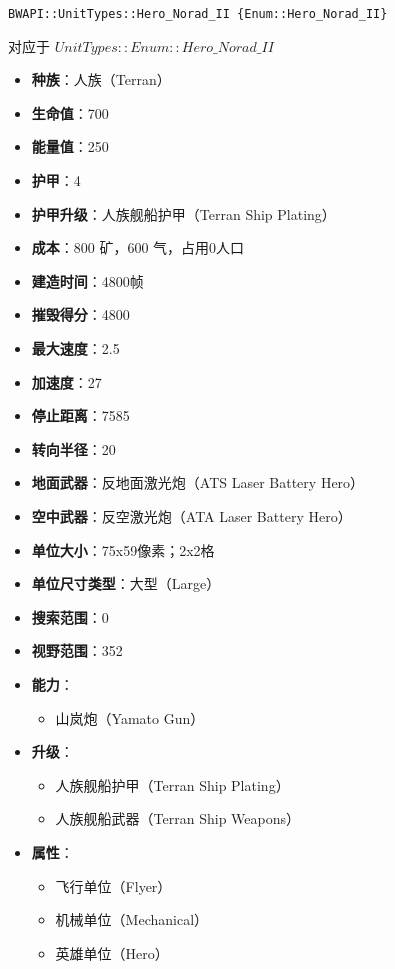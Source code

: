 \begin{tcolorbox}[colback=white, colframe=black!60!white, title=Hero\_Norad\_II(), arc=0mm]
    \begin{verbatim}
BWAPI::UnitTypes::Hero_Norad_II {Enum::Hero_Norad_II}
    \end{verbatim}
    对应于  $ UnitTypes::Enum::Hero\_Norad\_II $ 
    \begin{itemize}
        \item \textbf{种族}：人族（Terran）
        \item \textbf{生命值}：700
        \item \textbf{能量值}：250
        \item \textbf{护甲}：4
        \item \textbf{护甲升级}：人族舰船护甲（Terran Ship Plating）
        \item \textbf{成本}：800 矿，600 气，占用0人口
        \item \textbf{建造时间}：4800帧
        \item \textbf{摧毁得分}：4800
        \item \textbf{最大速度}：2.5
        \item \textbf{加速度}：27
        \item \textbf{停止距离}：7585
        \item \textbf{转向半径}：20
        \item \textbf{地面武器}：反地面激光炮（ATS Laser Battery Hero）
        \item \textbf{空中武器}：反空激光炮（ATA Laser Battery Hero）
        \item \textbf{单位大小}：75x59像素；2x2格
        \item \textbf{单位尺寸类型}：大型（Large）
        \item \textbf{搜索范围}：0
        \item \textbf{视野范围}：352
        \item \textbf{能力}：
            \begin{itemize}
                \item 山岚炮（Yamato Gun）
            \end{itemize}
        \item \textbf{升级}：
            \begin{itemize}
                \item 人族舰船护甲（Terran Ship Plating）
                \item 人族舰船武器（Terran Ship Weapons）
            \end{itemize}
        \item \textbf{属性}：
            \begin{itemize}
                \item 飞行单位（Flyer）
                \item 机械单位（Mechanical）
                \item 英雄单位（Hero）
            \end{itemize}
    \end{itemize}
\end{tcolorbox}

